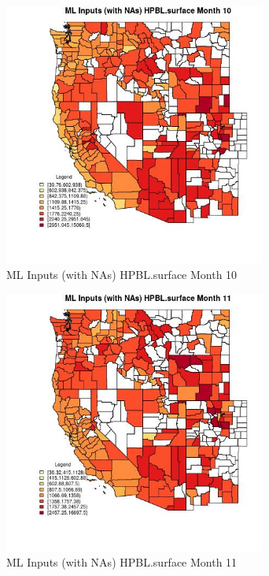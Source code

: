 \begin{figure} 
\centering  
\includegraphics[width=0.77\textwidth]{Code_Outputs/Report_ML_input_PM25_Step4_part_f_de_duplicated_aveswNAs_CountyHPBLsurfacemedianMonth10.jpg} 
\caption{\label{fig:Report_ML_input_PM25_Step4_part_f_de_duplicated_aveswNAsCountyHPBLsurfacemedianMonth10}ML Inputs (with NAs) HPBL.surface Month 10} 
\end{figure} 
 

\begin{figure} 
\centering  
\includegraphics[width=0.77\textwidth]{Code_Outputs/Report_ML_input_PM25_Step4_part_f_de_duplicated_aveswNAs_CountyHPBLsurfacemedianMonth11.jpg} 
\caption{\label{fig:Report_ML_input_PM25_Step4_part_f_de_duplicated_aveswNAsCountyHPBLsurfacemedianMonth11}ML Inputs (with NAs) HPBL.surface Month 11} 
\end{figure} 
 

